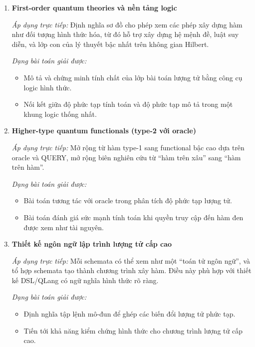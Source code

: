 \documentclass[12pt,a4paper]{article}
\begin{document}
\begin{enumerate}[leftmargin=*,itemsep=0.9em]
\item \textbf{First-order quantum theories và nền tảng logic}

\textit{Áp dụng trực tiếp:} Định nghĩa sơ đồ cho phép xem các phép xây dựng hàm như đối tượng hình thức hóa, từ đó hỗ trợ xây dựng hệ mệnh đề, luật suy diễn, và lớp con của lý thuyết bậc nhất trên không gian Hilbert.

\textit{Dạng bài toán giải được:}
\begin{itemize}[leftmargin=1.5em]
\item Mô tả và chứng minh tính chất của lớp bài toán lượng tử bằng công cụ logic hình thức.
\item Nối kết giữa độ phức tạp tính toán và độ phức tạp mô tả trong một khung logic thống nhất.
\end{itemize}

\item \textbf{Higher-type quantum functionals (type-2 với oracle)}

\textit{Áp dụng trực tiếp:} Mở rộng từ hàm type-1 sang functional bậc cao dựa trên oracle và QUERY, mở rộng biên nghiên cứu từ ``hàm trên xâu'' sang ``hàm trên hàm''.

\textit{Dạng bài toán giải được:}
\begin{itemize}[leftmargin=1.5em]
\item Bài toán tương tác với oracle trong phân tích độ phức tạp lượng tử.
\item Bài toán đánh giá sức mạnh tính toán khi quyền truy cập đến hàm đen được xem như tài nguyên.
\end{itemize}

\item \textbf{Thiết kế ngôn ngữ lập trình lượng tử cấp cao}

\textit{Áp dụng trực tiếp:} Mỗi schemata có thể xem như một ``toán tử ngôn ngữ'', và tổ hợp schemata tạo thành chương trình xây hàm. Điều này phù hợp với thiết kế DSL/QLang có ngữ nghĩa hình thức rõ ràng.

\textit{Dạng bài toán giải được:}
\begin{itemize}[leftmargin=1.5em]
\item Định nghĩa tập lệnh mô-đun để ghép các biến đổi lượng tử phức tạp.
\item Tiến tới khả năng kiểm chứng hình thức cho chương trình lượng tử cấp cao.
\end{itemize}
\end{enumerate}
\end{document}
